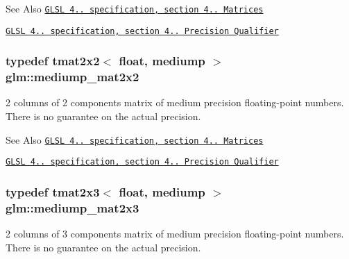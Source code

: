 \begin{DoxySeeAlso}{See Also}
\href{http://www.opengl.org/registry/doc/GLSLangSpec.4.20.8.pdf}{\tt G\-L\-S\-L 4.. specification, section 4.. Matrices} 

\href{http://www.opengl.org/registry/doc/GLSLangSpec.4.20.8.pdf}{\tt G\-L\-S\-L 4.. specification, section 4.. Precision Qualifier} 
\end{DoxySeeAlso}
\hypertarget{group__core__precision_ga7f27d5d720010e94d8a98eaaaf7f1f32}{
\subsubsection[{mediump\-\_\-mat2x2}]{\setlength{\rightskip}{0pt plus 5cm}typedef tmat2x2$<$ float, mediump $>$ {\bf glm\-::mediump\-\_\-mat2x2}}}\label{group__core__precision_ga7f27d5d720010e94d8a98eaaaf7f1f32}
2 columns of 2 components matrix of medium precision floating-\/point numbers. There is no guarantee on the actual precision.

\begin{DoxySeeAlso}{See Also}
\href{http://www.opengl.org/registry/doc/GLSLangSpec.4.20.8.pdf}{\tt G\-L\-S\-L 4.. specification, section 4.. Matrices} 

\href{http://www.opengl.org/registry/doc/GLSLangSpec.4.20.8.pdf}{\tt G\-L\-S\-L 4.. specification, section 4.. Precision Qualifier} 
\end{DoxySeeAlso}
\hypertarget{group__core__precision_ga39eba94b5dc46f46481c9c4428609731}{
\subsubsection[{mediump\-\_\-mat2x3}]{\setlength{\rightskip}{0pt plus 5cm}typedef tmat2x3$<$ float, mediump $>$ {\bf glm\-::mediump\-\_\-mat2x3}}}\label{group__core__precision_ga39eba94b5dc46f46481c9c4428609731}
2 columns of 3 components matrix of medium precision floating-\/point numbers. There is no guarantee on the actual precision.


